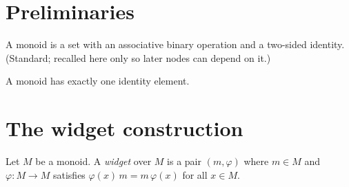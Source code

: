 %

\chapter{Preliminaries}


\begin{definition}[Monoid]
  \label{def:monoid}
  \mathlibok
  A monoid is a set with an associative binary operation and a two-sided
  identity. (Standard; recalled here only so later nodes can depend on it.)
\end{definition}

\begin{lemma}
  \label{lem:unique-identity}
  \mathlibok
  A monoid has exactly one identity element.
\end{lemma}

\chapter{The widget construction}


\begin{definition}
  \label{def:widget}
  Let $M$ be a monoid. A \emph{widget} over $M$ is a pair $(m, \varphi)$ where
  $m \in M$ and $\varphi : M \to M$ satisfies $\varphi(x)\,m = m\,\varphi(x)$
  for all $x \in M$.    %
\end{definition}

